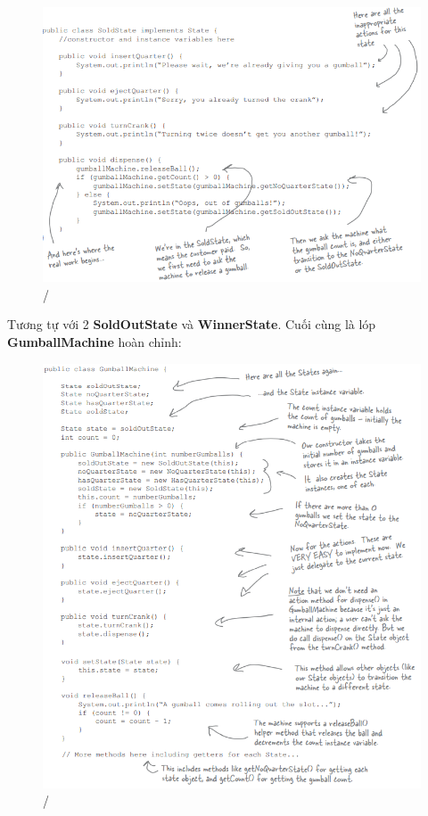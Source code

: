 \begin{figure}[!htb]
    \centering
    \includegraphics[width=\textwidth]{fig/State/SoldState.png}/
\end{figure}\newpage

Tương tự với 2 \textbf{SoldOutState} và \textbf{WinnerState}. Cuối cùng là lóp \textbf{GumballMachine} hoàn chỉnh:

\begin{figure}[!htb]
    \centering
    \includegraphics[width=\textwidth]{fig/State/GumballMachine_code.png}/
\end{figure}

